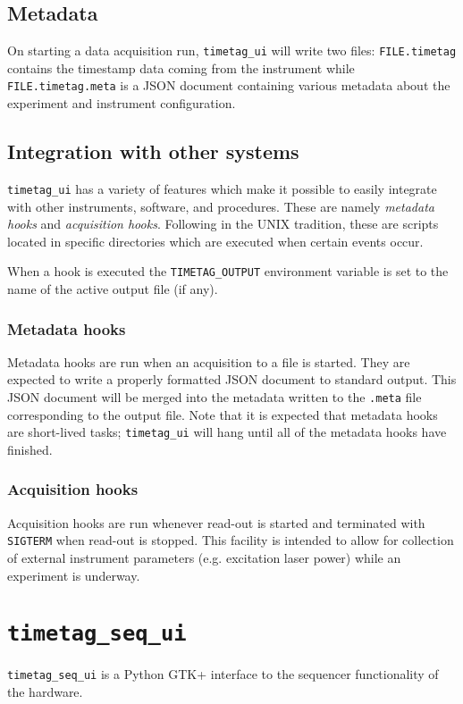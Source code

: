 \subsection{Metadata}

On starting a data acquisition run, {\tt timetag_ui} will write two files: 
{\tt FILE.timetag} contains the timestamp data coming from the
instrument while {\tt FILE.timetag.meta} is a JSON document containing
various metadata about the experiment and instrument configuration.

\subsection{Integration with other systems}

{\tt timetag_ui} has a variety of features which make it possible to
easily integrate with other instruments, software, and procedures.
These are namely {\it metadata hooks} and {\it acquisition
hooks}. Following in the UNIX tradition, these are scripts located in
specific directories which are executed when certain events occur.

When a hook is executed the {\tt TIMETAG_OUTPUT} environment variable
is set to the name of the active output file (if any).

\subsubsection{Metadata hooks}

Metadata hooks are run when an acquisition to a file is started. They
are expected to write a properly formatted JSON document to standard
output. This JSON document will be merged into the metadata written to
the {\tt .meta} file corresponding to the output file. Note that it is
expected that metadata hooks are short-lived tasks; {\tt timetag_ui}
will hang until all of the metadata hooks have finished.

\subsubsection{Acquisition hooks}

Acquisition hooks are run whenever read-out is started and terminated
with {\tt SIGTERM} when read-out is stopped. This facility is intended
to allow for collection of external instrument parameters
(e.g. excitation laser power) while an experiment is underway.

\section{\tt timetag\_seq\_ui}

{\tt timetag\_seq\_ui} is a Python GTK+ interface to the sequencer
functionality of the hardware.

